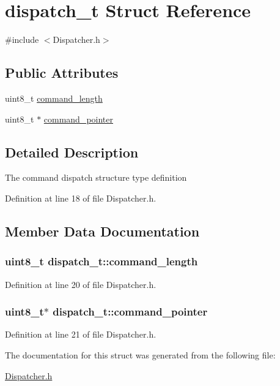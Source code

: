 \hypertarget{structdispatch__t}{\section{dispatch\-\_\-t \-Struct \-Reference}
\label{structdispatch__t}
}


{\ttfamily \#include $<$\-Dispatcher.\-h$>$}

\subsection*{\-Public \-Attributes}
\begin{DoxyCompactItemize}
\item 
uint8\-\_\-t \hyperlink{structdispatch__t_a5d402e61a328a433b3d2ba5e55d0c3c9}{command\-\_\-length}
\item 
uint8\-\_\-t $\ast$ \hyperlink{structdispatch__t_a052b015d03a27d58f92fb2d0f5f3f2b1}{command\-\_\-pointer}
\end{DoxyCompactItemize}


\subsection{\-Detailed \-Description}
\-The command dispatch structure type definition 

\-Definition at line 18 of file \-Dispatcher.\-h.



\subsection{\-Member \-Data \-Documentation}
\hypertarget{structdispatch__t_a5d402e61a328a433b3d2ba5e55d0c3c9}{
\subsubsection[{command\-\_\-length}]{\setlength{\rightskip}{0pt plus 5cm}uint8\-\_\-t {\bf dispatch\-\_\-t\-::command\-\_\-length}}}\label{structdispatch__t_a5d402e61a328a433b3d2ba5e55d0c3c9}


\-Definition at line 20 of file \-Dispatcher.\-h.

\hypertarget{structdispatch__t_a052b015d03a27d58f92fb2d0f5f3f2b1}{
\subsubsection[{command\-\_\-pointer}]{\setlength{\rightskip}{0pt plus 5cm}uint8\-\_\-t$\ast$ {\bf dispatch\-\_\-t\-::command\-\_\-pointer}}}\label{structdispatch__t_a052b015d03a27d58f92fb2d0f5f3f2b1}


\-Definition at line 21 of file \-Dispatcher.\-h.



\-The documentation for this struct was generated from the following file\-:\begin{DoxyCompactItemize}
\item 
\hyperlink{_dispatcher_8h}{\-Dispatcher.\-h}\end{DoxyCompactItemize}
